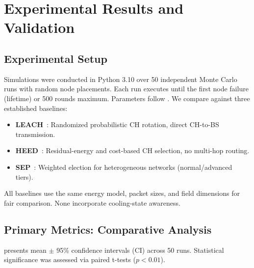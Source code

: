 \section{Experimental Results and Validation}
\label{sec:results}

\subsection{Experimental Setup}
Simulations were conducted in Python 3.10 over 50 independent Monte Carlo runs with random node placements. Each run executes until the first node failure (lifetime) or 500 rounds maximum. Parameters follow . We compare against three established baselines:
\begin{itemize}[noitemsep]
  \item \textbf{LEACH}~\cite{heinzelman2000leach}: Randomized probabilistic CH rotation, direct CH-to-BS transmission.
  \item \textbf{HEED}~\cite{younis2004heed}: Residual-energy and cost-based CH selection, no multi-hop routing.
  \item \textbf{SEP}~\cite{smaragdakis2004sep}: Weighted election for heterogeneous networks (normal/advanced tiers).
\end{itemize}
All baselines use the same energy model, packet sizes, and field dimensions for fair comparison. None incorporate cooling-state awareness.

\subsection{Primary Metrics: Comparative Analysis}

 presents mean $\pm$ 95\% confidence intervals (CI) across 50 runs. Statistical significance was assessed via paired t-tests ($p<0.01$).

